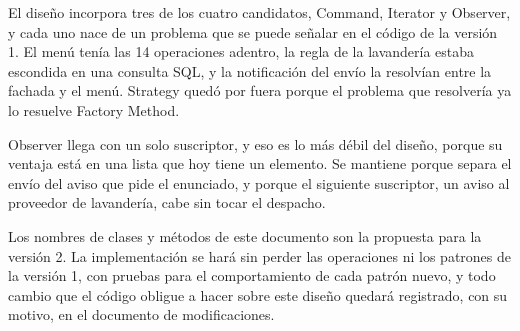 %
%

El diseño incorpora tres de los cuatro candidatos, Command, Iterator y Observer, y cada uno nace de un problema que se puede señalar en el código de la versión 1. El menú tenía las 14 operaciones adentro, la regla de la lavandería estaba escondida en una consulta SQL, y la notificación del envío la resolvían entre la fachada y el menú. Strategy quedó por fuera porque el problema que resolvería ya lo resuelve Factory Method.

Observer llega con un solo suscriptor, y eso es lo más débil del diseño, porque su ventaja está en una lista que hoy tiene un elemento. Se mantiene porque separa el envío del aviso que pide el enunciado, y porque el siguiente suscriptor, un aviso al proveedor de lavandería, cabe sin tocar el despacho.

Los nombres de clases y métodos de este documento son la propuesta para la versión 2. La implementación se hará sin perder las operaciones ni los patrones de la versión 1, con pruebas para el comportamiento de cada patrón nuevo, y todo cambio que el código obligue a hacer sobre este diseño quedará registrado, con su motivo, en el documento de modificaciones.
